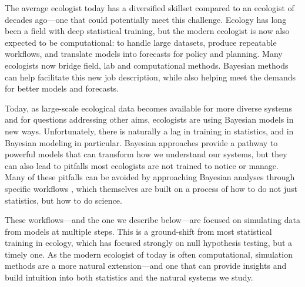 The average ecologist today has a diversified skillset compared to an ecologist of decades ago---one that could potentially meet this challenge. Ecology has long been a field with deep statistical training, but the modern ecologist is now also expected to be computational: to handle large datasets, produce repeatable workflows, and translate models into forecasts for policy and planning. Many ecologists now bridge field, lab and computational methods. Bayesian methods can help facilitate this new job description, while also helping meet the demands for better models and forecasts. %

Today, as large-scale ecological data becomes available for more diverse systems and for questions addressing other aims, ecologists are using Bayesian models in new ways. Unfortunately, there is naturally a lag in training in statistics, and in Bayesian modeling in particular. Bayesian approaches provide a pathway to powerful models that can transform how we understand our systems, but they can also lead to pitfalls most ecologists are not trained to notice or manage. Many of these pitfalls can be avoided by approaching Bayesian analyses through specific workflows \citep{betanworkflow,vandeschoot2021}, which themselves are built on a process of how to do not just statistics, but how to do science. %

These workflows---and the one we describe below---are focused on simulating data from models at multiple steps. This is a ground-shift from most statistical training in ecology, which has focused strongly on null hypothesis testing, but a timely one. As the modern ecologist of today is often computational, simulation methods are a more natural extension---and one that can provide insights and build intuition into both statistics and the natural systems we study. %
